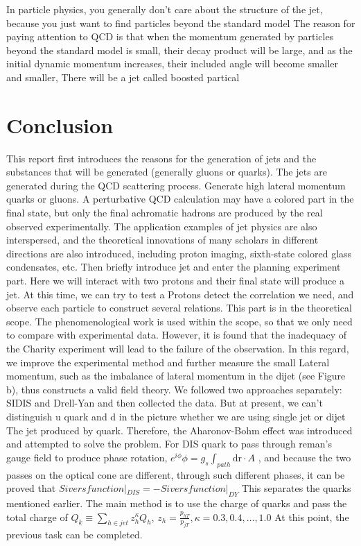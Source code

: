 \documentclass[12pt, a4paper, oneside]{article}
\begin{document}
\begin{spacing}{2.0}
In particle physics, you generally don't care about the structure of the jet, because you just want to find particles beyond the standard model
The reason for paying attention to QCD is that when the momentum generated by particles beyond the standard model is small, their decay product will be large, and as the initial dynamic momentum increases, their included angle will become smaller and smaller,
There will be a jet called boosted partical


\section{Conclusion}
This report first introduces the reasons for the generation of jets and the substances that will be generated (generally gluons or quarks). The jets are generated during the QCD scattering process.
Generate high lateral momentum quarks or gluons. A perturbative QCD calculation may have a colored part in the final state, but only the final achromatic hadrons are produced by the real
observed experimentally.
The application examples of jet physics are also interspersed, and the theoretical innovations of many scholars in different directions are also introduced, including proton imaging, sixth-state colored glass condensates, etc.
Then briefly introduce jet and enter the planning experiment part. Here we will interact with two protons and their final state will produce a jet. At this time, we can try to test a
Protons detect the correlation we need, and observe each particle to construct several relations. This part is in the theoretical scope.
The phenomenological work is used within the scope, so that we only need to compare with experimental data.
However, it is found that the inadequacy of the Charity experiment will lead to the failure of the observation. In this regard, we improve the experimental method and further measure the small
Lateral momentum, such as the imbalance of lateral momentum in the dijet (see Figure b), thus constructs a valid field theory.
We followed two approaches separately: SIDIS and Drell-Yan and then collected the data.
But at present, we can't distinguish u quark and d in the picture whether we are using single jet or dijet
The jet produced by quark. Therefore, the Aharonov-Bohm effect was introduced and attempted to solve the problem.
For DIS quark to pass through reman's gauge field to produce phase rotation, $e^{i\phi}$$\phi = g_s \int_{path} \mathrm{d r}\cdot A$
, and because the two passes on the optical cone are different, through such different phases, it can be proved that $Sivers function|_{DIS} = -Sivers function|_{DY}$
This separates the quarks mentioned earlier.
The main method is to use the charge of quarks and pass the total charge of $Q_k \equiv \sum_{h\in jet}z^{\kappa}_hQ_h$, $z_h = \frac{p_{hT}}{p_{jT }},\kappa = 0.3,0.4,\dots,1.0$
At this point, the previous task can be completed.



\end{spacing}



\end{document}
